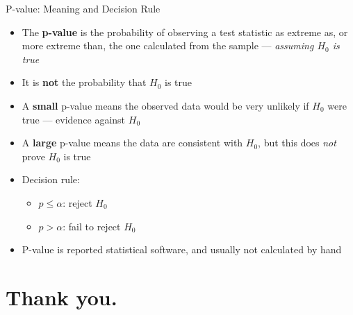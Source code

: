 \documentclass[12pt, aspectratio=169]{beamer}
\begin{document}
    \begin{frame}{P-value: Meaning and Decision Rule}
        \begin{itemize}
            \item The \textbf{p-value} is the probability of observing a test statistic
                as extreme as, or more extreme than, the one calculated from the sample ---
                \emph{assuming $H_0$ is true}
            \item It is \textbf{not} the probability that $H_0$ is true
            \item A \textbf{small} p-value means the observed data would be very
                unlikely if $H_0$ were true --- evidence against $H_0$
            \item A \textbf{large} p-value means the data are consistent with $H_0$, but this does \emph{not} prove $H_0$ is true
            \item Decision rule:
            \begin{itemize}
                \item $p \leqslant \alpha$: reject $H_0$
                \item $p > \alpha$: fail to reject $H_0$
            \end{itemize}
            \item P-value is reported statistical software, and usually not calculated by hand
        \end{itemize}
    \end{frame}


    \section*{Thank you.}
\end{document}
